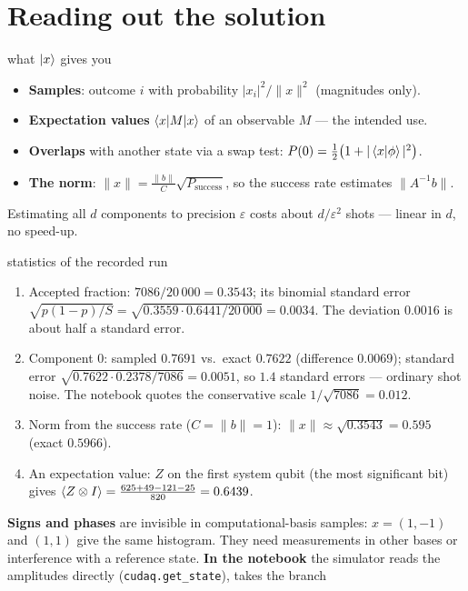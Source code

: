 \documentclass[11pt,a4paper,openany]{book}
\newcounter{wex}[chapter]
\newenvironment{steps}{\begin{enumerate}[label=\textbf{Step \arabic*.}, leftmargin=4.2em, itemsep=2pt]}{\end{enumerate}}
\begin{document}
\section{Reading out the solution}
\begin{keyres}{what $\ket x$ gives you}
\begin{itemize}[itemsep=1pt]
\item \textbf{Samples}: outcome $i$ with probability $|x_i|^2/\|x\|^2$ (magnitudes only).
\item \textbf{Expectation values} $\braket{x|M|x}$ of an observable $M$ --- the intended use.
\item \textbf{Overlaps} with another state via a swap test: $P(0) = \frac12\big(1 + |\braket{x|\phi}|^2\big)$.
\item \textbf{The norm}: $\|x\| = \frac{\|b\|}{C}\sqrt{P_{\text{success}}}$, so the success rate estimates $\|A^{-1}b\|$.
\end{itemize}
Estimating all $d$ components to precision $\varepsilon$ costs about $d/\varepsilon^2$ shots --- linear in $d$, no speed-up.
\end{keyres}
\begin{wexample}{statistics of the recorded run}
\begin{steps}
\item Accepted fraction: $7086/20\,000 = 0.3543$; its binomial standard error $\sqrt{p(1 - p)/S} = \sqrt{0.3559\cdot0.6441/20\,000} = 0.0034$. The deviation $0.0016$ is about half a standard error.
\item Component 0: sampled $0.7691$ vs.\ exact $0.7622$ (difference $0.0069$); standard error $\sqrt{0.7622\cdot0.2378/7086} = 0.0051$, so $1.4$ standard errors --- ordinary
      shot noise. The notebook quotes the conservative scale $1/\sqrt{7086} = 0.012$.
\item Norm from the success rate ($C = \|b\| = 1$): $\|x\| \approx \sqrt{0.3543} = 0.595$ (exact $0.5966$).
\item An expectation value: $Z$ on the first system qubit (the most significant bit) gives $\braket{Z\otimes I} = \frac{625 + 49 - 121 - 25}{820} = 0.6439$.
\end{steps}
\end{wexample}
\textbf{Signs and phases} are invisible in computational-basis samples: $x = (1, -1)$ and $(1, 1)$ give the same histogram. They need measurements in other
bases or interference with a reference state. \textbf{In the notebook} the simulator reads the amplitudes directly (\texttt{cudaq.get\_state}), takes the branch
\end{document}
